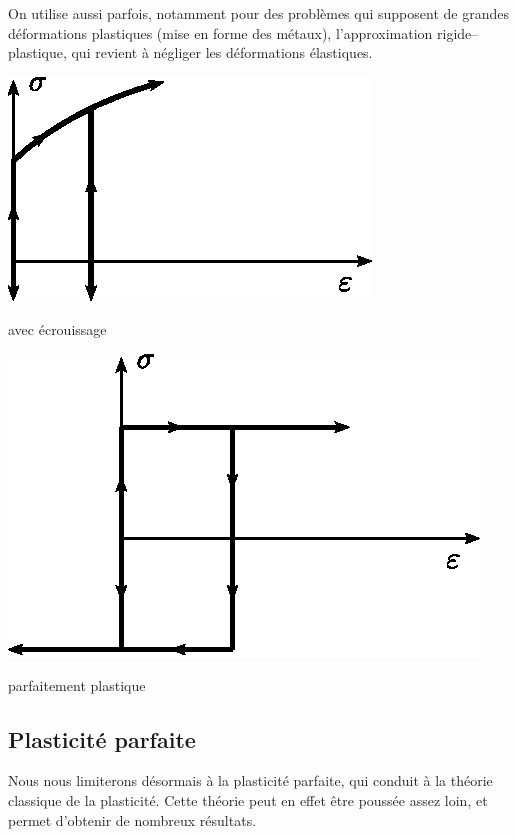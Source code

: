 On utilise aussi parfois, notamment pour des problèmes qui supposent de grandes déformations plastiques (mise en forme des métaux), l'approximation rigide--plastique, qui revient à négliger les déformations élastiques. 
\begin{multicols}{2}
    \begin{center}
        \includegraphics{../images/T1_Ch10-05}

        avec écrouissage
    \end{center}
    \begin{center}
        \includegraphics{../images/T1_Ch10-06}

        parfaitement plastique
    \end{center}
\end{multicols}

\subsection{Plasticité parfaite}
Nous nous limiterons désormais à la plasticité parfaite, qui conduit à la théorie classique de la plasticité.
Cette théorie peut en effet être poussée assez loin, et permet d'obtenir de nombreux résultats. 

